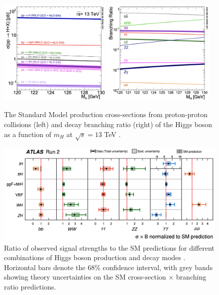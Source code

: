 \begin{figure}[h!]
    \center
    \includegraphics[width=0.48\textwidth]{Images/Theory/prodHiggs.png}
    \includegraphics[width=0.48\textwidth]{Images/Theory/decayHiggs.png}
    \caption{The Standard Model production cross-sections from proton-proton collisions (left) and decay branching ratio (right) of the Higgs boson as a function of $m_H$ at $\sqrt{s} = 13$ TeV \cite{LHCHiggsCrossSectionWorkingGroup:2016ypw}.}
    \label{fig:prodHcross}
\end{figure}
\begin{figure}[h!]
    \hspace{-0.48cm}
    \includegraphics[width=\textwidth]{Images/Theory/allMesRun2.png}
    \caption{Ratio of observed signal strengths to the SM predictions for different combinations of Higgs boson production and decay modes \cite{ATLAS:2022vkf}. Horizontal bars denote the 68\% confidence interval, with grey bands showing theory uncertainties on the SM cross-section $\times$ branching ratio predictions.}
    \label{fig:measprodH}
\end{figure}


